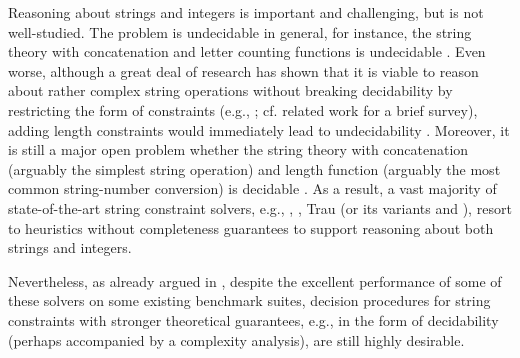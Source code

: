 
Reasoning about strings and integers is important and challenging, but is not well-studied. 
The problem is undecidable in general,  for instance, the string theory with concatenation and letter counting functions is undecidable \cite{buchi}. 
Even worse, although a great deal of research has shown that it is viable to reason about rather complex string operations without breaking decidability by %
restricting the form of constraints (e.g., \cite{CCH+18,CHL+19}; cf. related work for a brief survey), adding length constraints would immediately lead to undecidability \cite{CCH+18}. Moreover, it is still a major open problem whether the string theory with concatenation (arguably the simplest string operation) and length function (arguably the most common string-number conversion) is decidable \cite{Vijay-length}. 
%
As a result, a vast majority of  state-of-the-art string constraint solvers, e.g., {\cvc} \cite{cvc4}, {\zthree} \cite{Z3-str3}, Trau \cite{Abdulla17} (or its variants {\trauplus} \cite{AbdullaA+19} and {\zthreetrau} \cite{Z3-trau}),  
resort to heuristics without completeness guarantees to support reasoning about both strings and integers.

Nevertheless, as already argued in \cite{CHL+19}, despite the excellent performance of some of these solvers on some existing benchmark suites, decision procedures for string constraints with stronger theoretical guarantees, e.g., in the form of decidability (perhaps accompanied by a complexity analysis), are still highly desirable. 

